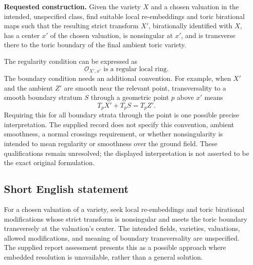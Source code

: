 \documentclass[11pt]{article}
\begin{document}
\textbf{Requested construction.} Given the variety \(X\) and a chosen valuation in the intended, unspecified class, find suitable local re-embeddings and toric birational maps such that the resulting strict transform \(X'\), birationally identified with \(X\), has a center \(x'\) of the chosen valuation, is nonsingular at \(x'\), and is transverse there to the toric boundary of the final ambient toric variety.

The regularity condition can be expressed as
\[
\mathcal O_{X',x'}\text{ is a regular local ring}.
\]
The boundary condition needs an additional convention. For example, when \(X'\) and the ambient \(Z'\) are smooth near the relevant point, transversality to a smooth boundary stratum \(S\) through a geometric point \(p\) above \(x'\) means
\[
T_pX'+T_pS=T_pZ'.
\]
Requiring this for all boundary strata through the point is one possible precise interpretation. The supplied record does not specify this convention, ambient smoothness, a normal crossings requirement, or whether nonsingularity is intended to mean regularity or smoothness over the ground field. These qualifications remain unresolved; the displayed interpretation is not asserted to be the exact original formulation.
\subsection{Short English statement}
For a chosen valuation of a variety, seek local re-embeddings and toric birational modifications whose strict transform is nonsingular and meets the toric boundary transversely at the valuation's center. The intended fields, varieties, valuations, allowed modifications, and meaning of boundary transversality are unspecified. The supplied report assessment presents this as a possible approach where embedded resolution is unavailable, rather than a general solution.
\end{document}
